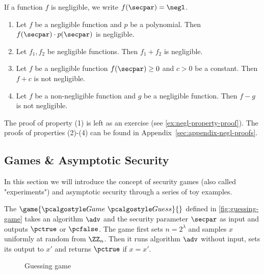 If a function $f$ is negligible, we write $f(\secpar) = \negl$.


\begin{lemma}
  \label{lem:negl}
  \hfill
  \begin{enumerate}
  \item Let $f$ be a negligible function and $p$ be a polynomial. Then $f(\secpar) \cdot p(\secpar)$ is negligible.
  \item Let $f_1, f_2$ be negligible functions. Then $f_1 + f_2$ is negligible.
  \item Let $f$ be a negligible function $f(\secpar) \ge 0$ and $c > 0$ be a constant. Then $f + c$ is not negligible.
  \item Let $f$ be a non-negligible function and $g$ be a negligible function. Then $f - g$ is not negligible.
  \end{enumerate}
\end{lemma}

The proof of property (1) is left as an exercise (see \autoref{ex:negl-property-proof}).
The proofs of properties (2)-(4) can be found in Appendix~\ref{sec:appendix-negl-proofs}.

\subsection{Games \& Asymptotic Security}

In this section we will introduce the concept of security games (also called "experiments") and asymptotic security through a series of toy examples.

The $\game{\Game~\algo{Guess}}{}$ defined in \autoref{fig:guessing-game} takes an algorithm $\adv$ and the security parameter $\secpar$ as input and outputs $\pctrue$ or $\pcfalse$.
The game first sets $n = 2^\lambda$ and samples $x$ uniformly at random from $\ZZ_n$.
Then it runs algorithm $\adv$ without input, sets its output to $x'$ and returns $\pctrue$ if $x = x'$.

\begin{figure}[tbhp]
  \begin{center}
    \begin{tcolorbox}[width=3cm]
      \begin{pchstack}[center]
      \end{pchstack}
    \end{tcolorbox}
  \end{center}
  \caption{Guessing game\label{fig:guessing-game}}
\end{figure}

